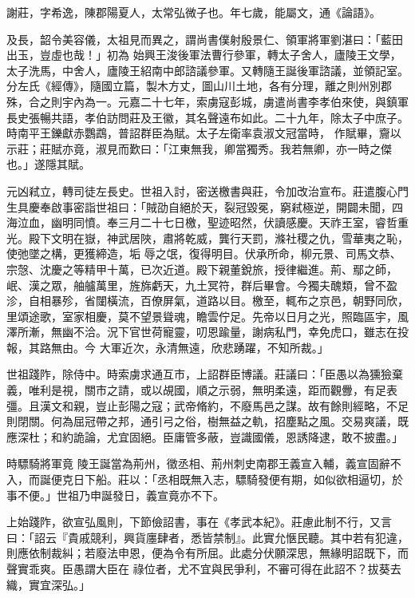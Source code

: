 
\begin{pinyinscope}

 謝莊，字希逸，陳郡陽夏人，太常弘微子也。年七歲，能屬文，通《論語》。



 及長，韶令美容儀，太祖見而異之，謂尚書僕射殷景仁、領軍將軍劉湛曰：「藍田出玉，豈虛也哉！」初為
 始興王浚後軍法曹行參軍，轉太子舍人，廬陵王文學，太子洗馬，中舍人，廬陵王紹南中郎諮議參軍。又轉隨王誕後軍諮議，並領記室。分左氏《經傳》，隨國立篇，製木方丈，圖山川土地，各有分理，離之則州別郡殊，合之則宇內為一。元嘉二十七年，索虜寇彭城，虜遣尚書李孝伯來使，與鎮軍長史張暢共語，孝伯訪問莊及王徽，其名聲遠布如此。二十九年，除太子中庶子。時南平王鑠獻赤鸚鵡，普詔群臣為賦。太子左衛率袁淑文冠當時，
 作賦畢，齎以示莊；莊賦亦竟，淑見而歎曰：「江東無我，卿當獨秀。我若無卿，亦一時之傑也。」遂隱其賦。



 元凶弒立，轉司徒左長史。世祖入討，密送檄書與莊，令加改治宣布。莊遣腹心門生具慶奉啟事密詣世祖曰：「賊劭自絕於天，裂冠毀冕，窮弒極逆，開闢未聞，四海泣血，幽明同憤。奉三月二十七日檄，聖迹昭然，伏讀感慶。天祚王室，睿哲重光。殿下文明在嶽，神武居陜，肅將乾威，龔行天罰，滌社稷之仇，雪華夷之恥，使弛墜之構，更獲締造，垢
 辱之氓，復得明目。伏承所命，柳元景、司馬文恭、宗愨、沈慶之等精甲十萬，已次近道。殿下親董銳旅，授律繼進。荊、鄢之師，岷、漢之眾，舳艫萬里，旌旆虧天，九土冥符，群后畢會。今獨夫醜類，曾不盈沴，自相暴殄，省闥橫流，百僚屏氣，道路以目。檄至，輒布之京邑，朝野同欣，里頌途歌，室家相慶，莫不望景聳魂，瞻雲佇足。先帝以日月之光，照臨區宇，風澤所漸，無幽不洽。況下官世荷寵靈，叨恩踰量，謝病私門，幸免虎口，雖志在投報，其路無由。今
 大軍近次，永清無遠，欣悲踴躍，不知所裁。」



 世祖踐阼，除侍中。時索虜求通互市，上詔群臣博議。莊議曰：「臣愚以為獯獫棄義，唯利是視，關市之請，或以覘國，順之示弱，無明柔遠，距而觀釁，有足表彊。且漢文和親，豈止彭陽之寇；武帝脩約，不廢馬邑之謀。故有餘則經略，不足則閉關。何為屈冠帶之邦，通引弓之俗，樹無益之軌，招塵點之風。交易爽議，既應深杜；和約詭論，尤宜固絕。臣庸管多蔽，豈識國儀，恩誘降逮，敢不披盡。」



 時驃騎將軍竟
 陵王誕當為荊州，徵丞相、荊州刺史南郡王義宣入輔，義宣固辭不入，而誕便克日下船。莊以：「丞相既無入志，驃騎發便有期，如似欲相逼切，於事不便。」世祖乃申誕發日，義宣竟亦不下。



 上始踐阼，欲宣弘風則，下節儉詔書，事在《孝武本紀》。莊慮此制不行，又言曰：「詔云『貴戚競利，興貨廛肆者，悉皆禁制』。此實允愜民聽。其中若有犯違，則應依制裁糾；若廢法申恩，便為令有所屈。此處分伏願深思，無緣明詔既下，而聲實乖爽。臣愚謂大臣在
 祿位者，尤不宜與民爭利，不審可得在此詔不？拔葵去織，實宜深弘。」




\end{pinyinscope}
